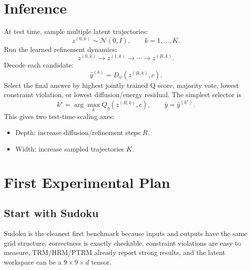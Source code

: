 \documentclass[11pt]{article}
\begin{document}
\section{Inference}

At test time, sample multiple latent trajectories:
\[
    z^{(0,k)}\sim\mathcal N(0,I),
    \qquad
    k=1,\dots,K.
\]
Run the learned refinement dynamics:
\[
    z^{(0,k)}\rightarrow z^{(1,k)}
    \rightarrow \cdots \rightarrow z^{(R,k)}.
\]
Decode each candidate:
\[
    \hat y^{(k)} = D_\psi(z^{(R,k)},c).
\]
Select the final answer by highest jointly trained Q score, majority vote, lowest constraint violation, or lowest diffusion/energy residual. The simplest selector is
\[
    k^\star
    =
    \arg\max_k Q_\eta(z^{(R,k)},c),
    \qquad
    \hat y=\hat y^{(k^\star)}.
\]
This gives two test-time scaling axes:
\begin{itemize}[itemsep=0pt]
    \item Depth: increase diffusion/refinement steps \(R\).
    \item Width: increase sampled trajectories \(K\).
\end{itemize}

\section{First Experimental Plan}

\subsection{Start with Sudoku}

Sudoku is the cleanest first benchmark because inputs and outputs have the same grid structure, correctness is exactly checkable, constraint violations are easy to measure, TRM/HRM/PTRM already report strong results, and the latent workspace can be a \(9\times 9\times d\) tensor.
\end{document}
